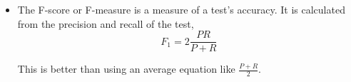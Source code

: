 \begin{itemize}
    \item The F-score or F-measure is a measure of a test's accuracy. It is calculated from the precision and recall of the test,
    \begin{equation}
        F_1 = 2 \frac{PR}{P+R}
    \end{equation}
    
    This is better than using an average equation like $\frac{P+R}{2}$.
    

\end{itemize}

 